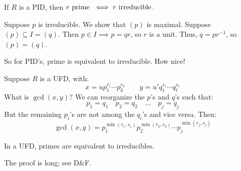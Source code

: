 \begin{thm}
    If $ R $ is a PID, then $ r \textrm{ prime } \iff r \textrm{ irreducible} $.
\end{thm}

\begin{pf}[source=Primary Source Material]
    Suppose $ p $ is irreducible. We show that $ (p) $ is maximal. \vsp
    Suppose $ (p) \subseteq I = (q) $. Then $ p \in I \implies p=qr $, so $ r $ is a unit.
    Thus, $ q=pr^{-1} $, so $ (p) = (q) $.
\end{pf}
So for PID's, prime is equivalent to irreducible. How nice!

Suppose $ R $ is a UFD, with:
\begin{equation*}
    x = up_{1}^{r_{1}}\cdots p_{k}^{r_{k}} \qquad
    y = u'q_{1}^{s_{1}}\cdots q_{\ell}^{s_{\ell}}
\end{equation*}
What is $ \gcd(x,y) $? We can reorganize the $ p $'s and $ q $'s such that:
\begin{equation*}
    p_{1}=q_{1} \quad p_{2}=q_{2} \quad \dots \quad p_{j}=q_{j}
\end{equation*}
But the remaining $ p_{i} $'s are not among the $ q_{i} $'s and vice versa. Then:
\begin{equation*}
    \gcd(x,y) = p_{1}^{\min(r_{1},s_{1})}p_{2}^{\min(r_{2},s_{2})}\cdots p_{j}^{\min(r_{j},s_{j})}
\end{equation*}

\begin{thm}
    In a UFD, primes are equivalent to irreducibles.
\end{thm}
The proof is long; see D\&F.


